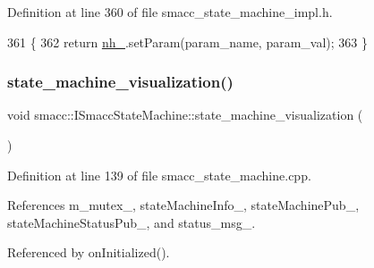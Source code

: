 Definition at line 360 of file smacc\+\_\+state\+\_\+machine\+\_\+impl.\+h.


\begin{DoxyCode}
361   \{
362     \textcolor{keywordflow}{return} \hyperlink{classsmacc_1_1ISmaccStateMachine_ad8877bcca9dbb345fe72cca839c93dd3}{nh\_}.setParam(param\_name, param\_val);
363   \}
\end{DoxyCode}
\mbox{\label{classsmacc_1_1ISmaccStateMachine_ac03029f770422d0ea77ea9856b8cb1a8}} 
\subsubsection{\texorpdfstring{state\+\_\+machine\+\_\+visualization()}{state\_machine\_visualization()}}
{\footnotesize\ttfamily void smacc\+::\+I\+Smacc\+State\+Machine\+::state\+\_\+machine\+\_\+visualization (\begin{DoxyParamCaption}\item[{const ros\+::\+Timer\+Event \&}]{ }\end{DoxyParamCaption})}



Definition at line 139 of file smacc\+\_\+state\+\_\+machine.\+cpp.



References m\+\_\+mutex\+\_\+, state\+Machine\+Info\+\_\+, state\+Machine\+Pub\+\_\+, state\+Machine\+Status\+Pub\+\_\+, and status\+\_\+msg\+\_\+.



Referenced by on\+Initialized().


